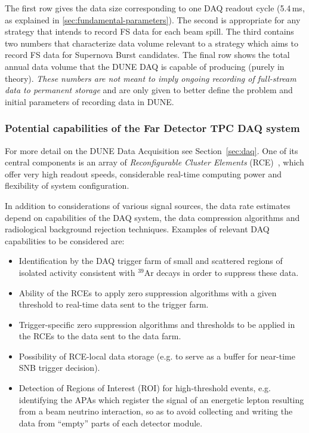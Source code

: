 The first row gives the data size corresponding to one DAQ readout cycle (5.4\,ms, as explained in \ref{sec:fundamental-parameters}).
The second is appropriate for any strategy that intends to record FS data for each beam spill.
The third contains two numbers that characterize data volume relevant to a strategy which aims
to record FS data for Supernova Burst candidates. The final row  shows the total annual data
volume that the DUNE DAQ is capable of producing (purely in theory).
\textit{These numbers are not meant to imply ongoing recording of full-stream
data to permanent storage} and are only given to better define the problem and initial parameters
of recording data in DUNE.


\subsubsection{Potential capabilities of the Far Detector TPC DAQ system}
\label{sec:daq-assumptions}
For more detail on the DUNE Data Acquisition see Section~\ref{sec:daq}. One of its central components
is an array of \textit{Reconfigurable Cluster Elements} (RCE)~\cite{slac_rce_1}, which offer very high
readout speeds, considerable real-time computing power and flexibility of system configuration.

In addition to considerations of various signal sources, the data rate estimates depend on capabilities of the DAQ system,
the data compression algorithms and radiological background rejection techniques.
Examples of relevant DAQ capabilities to be considered are:

\begin{itemize}

\item Identification by the DAQ trigger farm of small and scattered regions of isolated activity
  consistent with $^{39}$Ar decays in order to suppress these data.

\item Ability of the RCEs to apply zero suppression algorithms
with a given threshold to real-time data sent to the trigger farm.

\item Trigger-specific zero suppression algorithms and thresholds to be applied
in the RCEs to the data sent to the data farm.

\item Possibility of RCE-local data storage (e.g. to serve as a buffer for near-time SNB trigger decision).

\item Detection of Regions of Interest (ROI) for high-threshold events, e.g. identifying the APAs
which register the signal of an energetic lepton resulting from a beam neutrino interaction, so as
to avoid collecting and writing the data from ``empty'' parts of each detector module.

\end{itemize}

